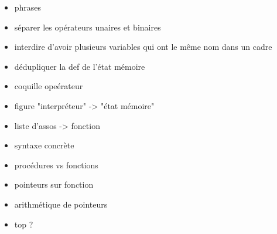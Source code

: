 \begin{itemize}
\item phrases
\item séparer les opérateurs unaires et binaires
\item interdire d'avoir plusieurs variables qui ont le même nom dans un cadre
\item dédupliquer la def de l'état mémoire
\item coquille opeérateur
\item figure "interpréteur" -> "état mémoire"
\item liste d'assos -> fonction
\item syntaxe concrète
\item procédures vs fonctions
\item pointeurs sur fonction
\item arithmétique de pointeurs
\item top ?
\end{itemize}

